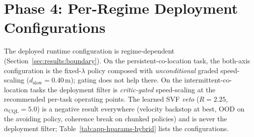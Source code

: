 \documentclass[11pt,a4paper]{report}
\begin{document}
\section{Phase 4: Per-Regime Deployment Configurations}
\label{app:hparams:hybrid}

The deployed runtime configuration is regime-dependent
(Section~\ref{sec:results:boundary}). On the persistent-co-location
task, the both-axis configuration is the fixed-$\lambda$ policy
composed with \emph{unconditional} graded speed-scaling
($d_{\mathrm{slow}} = 0.40$\,m); gating does not help there. On the
intermittent-co-location tasks the deployment filter is
\emph{critic-gated} speed-scaling at the recommended per-task
operating points. The learned SVF \emph{veto} ($R = 2.25$,
$\alpha_{\mathrm{CQL}} = 5.0$) is a negative result everywhere
(velocity backstop at best, OOD on the avoiding policy, coherence
break on chunked policies) and is never the deployment filter;
Table~\ref{tab:app-hparams-hybrid} lists the configurations.

\begin{table}[htbp]
\centering
\small
\caption{Runtime deployment configurations per regime. The veto and
the model-based dodges are taxonomy points, not deployment
configurations.}
\label{tab:app-hparams-hybrid}
\end{table}
\end{document}
